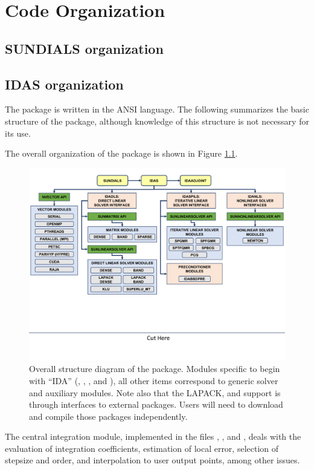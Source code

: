 \chapter{Code Organization}\label{s:organization}

\section{SUNDIALS organization}\label{ss:sun_org}


\section{IDAS organization}\label{ss:idas_org}

The {\idas} package is written in the ANSI {\CC} language. The following
summarizes the basic structure of the package, although knowledge
of this structure is not necessary for its use.

The overall organization of the {\idas} package is shown in Figure
\ref{f:idasorg}.
\begin{figure}
{\centerline{\includegraphics[width=\textwidth]{idasorg}}}
\caption [Overall structure diagram of the {\ida} package]
{Overall structure diagram of the {\ida} package.
  Modules specific to {\ida} begin with ``IDA'' ({\idadls},
  {\idaspils}, {\idabbdpre}, and {\idanls}), all other items correspond
  to generic solver and auxiliary modules. 
  Note also that the LAPACK, {\klu} and {\superlumt} support is
  through interfaces to external packages. 
  Users will need to download and compile those packages independently.}
\label{f:idasorg}
\end{figure}
The central integration module, implemented in the files ,
, and , deals with the evaluation of integration 
coefficients, estimation of local error,
selection of stepsize and order, and interpolation to user output
points, among other issues.

